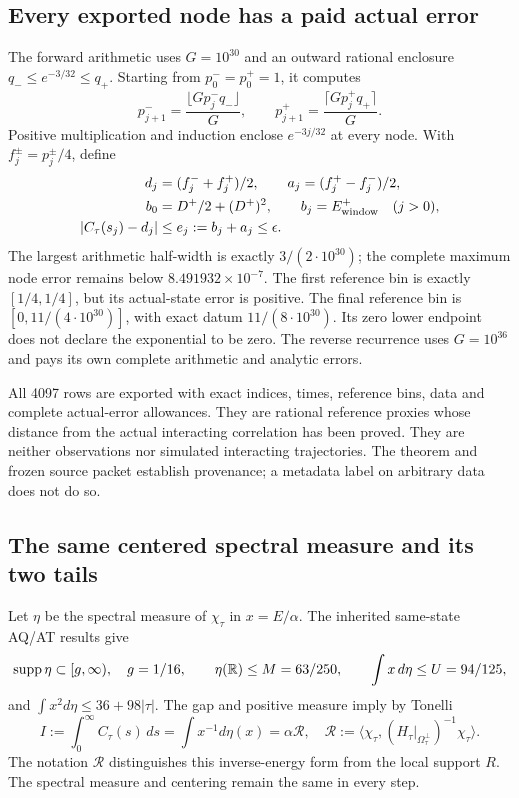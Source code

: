 \subsection{Every exported node has a paid actual error}
The forward arithmetic uses $G=10^{30}$ and an outward rational enclosure
$q_-\le e^{-3/32}\le q_+$. Starting from $p_0^-=p_0^+=1$, it computes
\begin{equation}
 p_{j+1}^-=\frac{\lfloor Gp_j^-q_-\rfloor}{G},\qquad
 p_{j+1}^+=\frac{\lceil Gp_j^+q_+\rceil}{G}.
 \label{eq:recurrence}
\end{equation}
Positive multiplication and induction enclose $e^{-3j/32}$ at every node.
With $f_j^\pm=p_j^\pm/4$, define
\begin{align}
 d_j&=(f_j^-+f_j^+)/2,\qquad a_j=(f_j^+-f_j^-)/2,\\
 b_0&=D^+/2+(D^+)^2,\qquad b_j=E_{\rm window}^+\quad(j>0),\\
 |C_\tau(s_j)-d_j|&\le e_j:=b_j+a_j\le\epsilon.
 \label{eq:node-errors}
\end{align}
The largest arithmetic half-width is exactly $3/(2\cdot10^{30})$; the complete
maximum node error remains below $8.491932\times10^{-7}$. The first reference
bin is exactly $[1/4,1/4]$, but its actual-state error is positive. The final
reference bin is $[0,11/(4\cdot10^{30})]$, with exact datum
$11/(8\cdot10^{30})$. Its zero lower endpoint does not declare the exponential
to be zero. The reverse recurrence uses $G=10^{36}$ and pays its own complete
arithmetic and analytic errors.

All 4097 rows are exported with exact indices, times, reference bins, data and
complete actual-error allowances. They are rational reference proxies whose
distance from the actual interacting correlation has been proved. They are
neither observations nor simulated interacting trajectories. The theorem and
frozen source packet establish provenance; a metadata label on arbitrary data
does not do so.

\subsection{The same centered spectral measure and its two tails}
Let $\eta$ be the spectral measure of $\chi_\tau$ in $x=E/\alpha$. The inherited
same-state AQ/AT results give
\begin{equation}
 \operatorname{supp}\eta\subset[g,\infty),\quad g=1/16,\qquad
 \eta(\mathbb R)\le M=63/250,\qquad
 \int x\,d\eta\le U=94/125,
 \label{eq:measure-bounds}
\end{equation}
and $\int x^2d\eta\le36+98|\tau|$. The gap and positive measure imply by Tonelli
\begin{equation}
 I:=\int_0^\infty C_\tau(s)\,ds
 =\int x^{-1}d\eta(x)=\alpha\mathcal R,
 \quad
 \mathcal R:=\langle\chi_\tau,(H_\tau|_{\Omega_\tau^\perp})^{-1}
 \chi_\tau\rangle.
 \label{eq:inverse}
\end{equation}
The notation $\mathcal R$ distinguishes this inverse-energy form from the
local support $R$. The spectral measure and centering remain the same in every
step.

